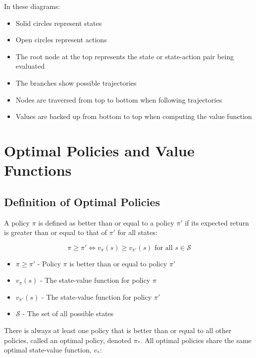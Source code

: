 \documentclass[12pt,a4paper]{article}
\begin{document}
In these diagrams:
\begin{itemize}
    \item Solid circles represent states
    \item Open circles represent actions
    \item The root node at the top represents the state or state-action pair being evaluated
    \item The branches show possible trajectories
    \item Nodes are traversed from top to bottom when following trajectories
    \item Values are backed up from bottom to top when computing the value function
\end{itemize}

\section{Optimal Policies and Value Functions}

\subsection{Definition of Optimal Policies}

A policy $\pi$ is defined as better than or equal to a policy $\pi'$ if its expected return is greater than or equal to that of $\pi'$ for all states:

\begin{equation}
\pi \geq \pi' \iff v_\pi(s) \geq v_{\pi'}(s) \text{ for all } s \in \mathcal{S}
\end{equation}

\begin{tcolorbox}[title=Notation Overview]
\begin{itemize}
    \item $\pi \geq \pi'$ - Policy $\pi$ is better than or equal to policy $\pi'$
    \item $v_\pi(s)$ - The state-value function for policy $\pi$
    \item $v_{\pi'}(s)$ - The state-value function for policy $\pi'$
    \item $\mathcal{S}$ - The set of all possible states
\end{itemize}
\end{tcolorbox}

There is always at least one policy that is better than or equal to all other policies, called an optimal policy, denoted $\pi_*$. All optimal policies share the same optimal state-value function, $v_*$:
\end{document}
